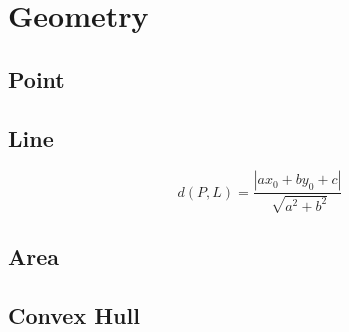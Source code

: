 \section{Geometry}
    \subsection{Point}
        
    \subsection{Line}
        
        \[d(P, L) = \frac{|ax_0 + by_0 + c|}{\sqrt[]{a^2 + b^2}}\]
    \subsection{Area}
        
    \subsection{Convex Hull}
        